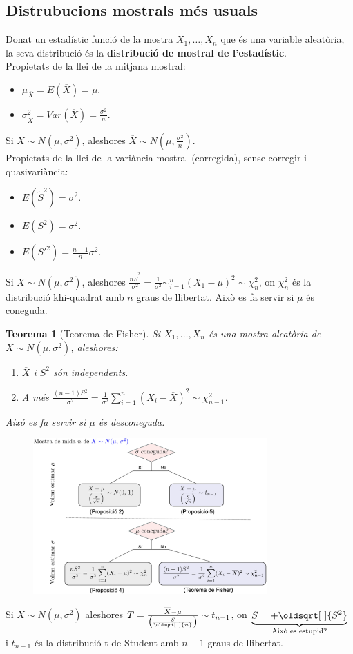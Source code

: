 \documentclass[a4paper]{sciposter}
\newtheorem{teorema}{Teorema}
\renewcommand*{\sqrt}[2][\ ]{\oldsqrt[#1]{#2} }
\begin{document}
\begin{multicols}{3}
\subsection{Distrubucions mostrals més usuals}
Donat un estadístic funció de la mostra $X_1,\dots,X_n$ que és una variable aleatòria, la seva distribució és la \textbf{distribució de mostral de l'estadístic}.\\
Propietats de la llei de la mitjana mostral:
\begin{itemize}
	\item $\mu_{\overline{X}} = E(\overline{X}) = \mu$.
	\item $\sigma^2_{\overline{X}} = Var(\overline{X}) = \frac{\sigma^2}{n}$.
\end{itemize}
Si $X \sim N(\mu,\sigma^2)$, aleshores $\overline{X} \sim N(\mu,\frac{\sigma^2}{n})$.\\
Propietats de la llei de la variància mostral (corregida), sense corregir i quasivariància:
\begin{itemize}
	\item $E(\tilde{S}^2) = \sigma^2$.
	\item $E(S^2) = \sigma^2$.
	\item $E(S'^2) = \frac{n-1}{n}\sigma^2$.
\end{itemize}
Si $X \sim N(\mu,\sigma^2)$, aleshores $\frac{n\tilde{S}^2}{\sigma^2} = \frac{1}{\sigma^2} \sim^n_{i=1}(X_1-\mu)^2 \sim \chi^2_n$, on $\chi^2_n$ és la distribució khi-quadrat amb $n$ graus de llibertat. Això es fa servir si $\mu$ és coneguda.\\
\begin{teorema}[Teorema de Fisher]
Si $X_1, \dots, X_n$ és una mostra aleatòria de $X \sim N(\mu,\sigma^2)$, aleshores:
\begin{enumerate}
	\item $\overline{X}$ i $S^2$ són independents.
	\item A més $\frac{(n-1)S^2}{\sigma^2} = \frac{1}{\sigma^2} \sum\limits_{i=1}^{n} (X_i - \overline{X})^2 \sim \chi^2_{n-1}$.
\end{enumerate}
Aixó es fa servir si $\mu$ és desconeguda.
\end{teorema}
\begin{figure}[H]
    \centering
    \includegraphics[width=0.8\textwidth]{fix.png}
\end{figure}
Si $X \sim N(\mu, \sigma^2)$ aleshores $T = \frac{\overline{X} - \mu}{\left(\frac{S}{\sqrt{n}}\right)} \sim t_{n-1}$, on $\underbrace{S = +\sqrt{S^2}}_\text{Això es estupid?}$ i $t_{n-1}$ és la distribució t de Student amb $n-1$ graus de llibertat.

\end{multicols}
\end{document}
